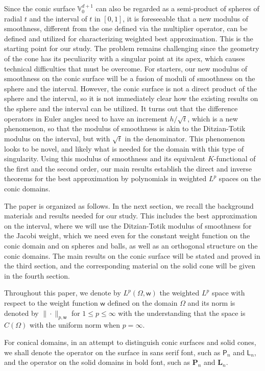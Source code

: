 \documentclass{amsart}
\theoremstyle{remark}
\def\Lb{{\mathbf L}}
\def\Pb{{\mathbf P}}
\def\VV{{\mathbb V}}
\def\sL{{\mathsf L}}
\def\sP{{\mathsf P}}
\def\sw{{\mathsf w}}
\def\Lb{{\mathbf L}}
\def\Pb{{\mathbf P}}
\def\VV{{\mathbb V}}
\begin{document}
Since the conic surface $\VV_0^{d+1}$ can also be regarded as a semi-product of spheres of radial $t$ and the 
interval of $t$ in $[0,1]$, it is foreseeable that a new modulus of smoothness, different from the one defined via the 
multiplier operator, can be defined and utilized for characterizing weighted best approximation. This is the starting 
point for our study. The problem remains challenging since the geometry of the cone has its peculiarity with a  
singular point at its apex, which causes technical difficulties that must be overcome. For starters, our new modulus
of smoothness on the conic surface will be a fusion of moduli of smoothness on the sphere and the interval. 
However, the conic surface is not a direct product of the sphere and the interval, so it is not immediately 
clear how the existing results on the sphere and the interval can be utilized. It turns out that the difference 
operators in Euler angles need to have an increment $h/\sqrt{t}$, which is a new phenomenon, so that the modulus 
of smoothness is akin to the Ditzian-Totik modulus on the interval, but with $\sqrt{t}$ in the denominator. This 
phenomenon looks to be novel, and likely what is needed for the domain with this type of singularity. 
Using this modulus of smoothness and its equivalent $K$-functional of the first and the second order, 
our main results establish the direct and inverse theorems for the best approximation by polynomials in 
weighted $L^p$ spaces on the conic domains. 

The paper is organized as follows. In the next section, we recall the background materials and results needed 
for our study. This includes the best approximation on the interval, where we will use the Ditzian-Totik modulus of 
smoothness for the Jacobi weight, which we need even for the constant weight function on the conic domain and 
on spheres and balls, as well as an orthogonal structure on the conic domains. The main results on the conic surface 
will be stated and proved in the third section, and the corresponding material on the solid cone will be given in the 
fourth section.  

Throughout this paper, we denote by $L^p(\Omega, \sw)$ the weighted $L^p$ space with respect to the weight 
function $\sw$ defined on the domain $\Omega$ and its norm is denoted by $\|\cdot\|_{p,\sw}$ for $1 \le p \le \infty$
with the understanding that the space is $C(\Omega)$ with the uniform norm when $p= \infty$. 

For conical domains, in an attempt to distinguish conic surfaces and solid cones, we shall denote the operator 
on the surface in sans serif font, such as $\sP_n$ and $\sL_n$, and the operator on the solid domains in bold font, 
such as $\Pb_n$ and $\Lb_n$. 
\end{document}
